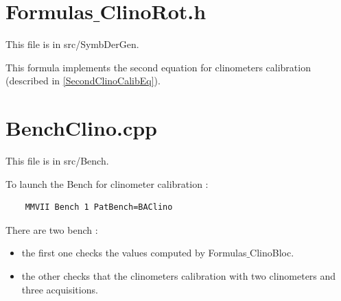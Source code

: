 \section{Formulas$\_$ClinoRot.h}

This file is in src/SymbDerGen.

This formula implements the second equation for clinometers calibration (described in \ref{SecondClinoCalibEq}).


\section{BenchClino.cpp}

This file is in src/Bench.

To launch the Bench for clinometer calibration : 
\begin{lstlisting}
    MMVII Bench 1 PatBench=BAClino
\end{lstlisting}

There are two bench :
\begin{itemize}
    \item the first one checks the values computed by Formulas$\_$ClinoBloc.
    \item the other checks that the clinometers calibration with two clinometers and three acquisitions.
\end{itemize}